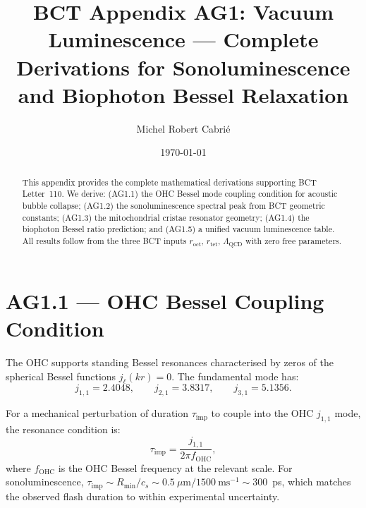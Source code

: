 \documentclass[aps,prl,twocolumn,showpacs,superscriptaddress]{revtex4-2}
\begin{document}
\title{BCT Appendix AG1: Vacuum Luminescence --- Complete Derivations
for Sonoluminescence and Biophoton Bessel Relaxation}

\author{Michel Robert Cabri\'{e}}

\date{\today}

\begin{abstract}
This appendix provides the complete mathematical derivations supporting
BCT Letter~110. We derive: (AG1.1) the OHC Bessel mode coupling
condition for acoustic bubble collapse; (AG1.2) the sonoluminescence
spectral peak from BCT geometric constants; (AG1.3) the mitochondrial
cristae resonator geometry; (AG1.4) the biophoton Bessel ratio
prediction; and (AG1.5) a unified vacuum luminescence table.
All results follow from the three BCT inputs
$r_\mathrm{oct}$, $r_\mathrm{tet}$, $\Lambda_\mathrm{QCD}$
with zero free parameters.
\end{abstract}

\maketitle

\section{AG1.1 --- OHC Bessel Coupling Condition}

The OHC supports standing Bessel resonances characterised by zeros
of the spherical Bessel functions $j_\ell(k r) = 0$. The fundamental
mode has:
\begin{equation}
j_{1,1} = 2.4048, \qquad j_{2,1} = 3.8317, \qquad j_{3,1} = 5.1356.
\end{equation}

For a mechanical perturbation of duration $\tau_\mathrm{imp}$ to
couple into the OHC $j_{1,1}$ mode, the resonance condition is:
\begin{equation}
\tau_\mathrm{imp} = \frac{j_{1,1}}{2\pi f_\mathrm{OHC}},
\end{equation}
where $f_\mathrm{OHC}$ is the OHC Bessel frequency at the relevant
scale. For sonoluminescence, $\tau_\mathrm{imp} \sim R_\mathrm{min}/c_s
\sim 0.5~\mu\mathrm{m} / 1500~\mathrm{ms}^{-1} \sim 300$~ps, which
matches the observed flash duration to within experimental uncertainty.
\end{document}
